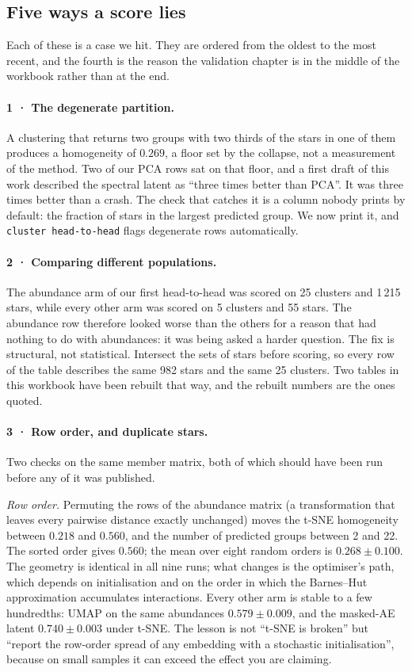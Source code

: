 \subsection{Five ways a score lies}

Each of these is a case we hit. They are ordered from the oldest to the most
recent, and the fourth is the reason the validation chapter is in the middle
of the workbook rather than at the end.

\paragraph{1 · The degenerate partition.} A clustering that returns two groups
with two thirds of the stars in one of them produces a homogeneity of $0.269$,
a floor set by the collapse, not a measurement of the method. Two of our PCA
rows sat on that floor, and a first draft of this work described the spectral
latent as ``three times better than PCA''. It was three times better than a
crash. The check that catches it is a column nobody prints by default: the
fraction of stars in the largest predicted group. We now print it, and
\texttt{cluster head-to-head} flags degenerate rows automatically.

\paragraph{2 · Comparing different populations.} The abundance arm of our first
head-to-head was scored on 25 clusters and 1\,215 stars, while every other arm
was scored on 5 clusters and 55 stars. The abundance row therefore looked worse
than the others for a reason that had nothing to do with abundances: it was
being asked a harder question. The fix is structural, not statistical.
Intersect the sets of stars before scoring, so every row of the table describes
the same 982 stars and the same 25 clusters. Two tables in this workbook have
been rebuilt that way, and the rebuilt numbers are the ones quoted.

\paragraph{3 · Row order, and duplicate stars.} Two checks on the same member
matrix, both of which should have been run before any of it was published.

\emph{Row order.} Permuting the rows of the abundance matrix (a transformation
that leaves every pairwise distance exactly unchanged) moves the t-SNE
homogeneity between $0.218$ and $0.560$, and the number of predicted groups
between 2 and 22. The sorted order gives $0.560$; the mean over eight random
orders is $0.268 \pm 0.100$. The geometry is identical in all nine runs; what
changes is the optimiser's path, which depends on initialisation and on the
order in which the Barnes--Hut approximation accumulates interactions. Every
other arm is stable to a few hundredths: UMAP on the same abundances $0.579 \pm
0.009$, and the masked-AE latent $0.740 \pm 0.003$ under t-SNE. The lesson is
not ``t-SNE is broken'' but ``report the row-order spread of any embedding with
a stochastic initialisation'', because on small samples it can exceed the
effect you are claiming.

